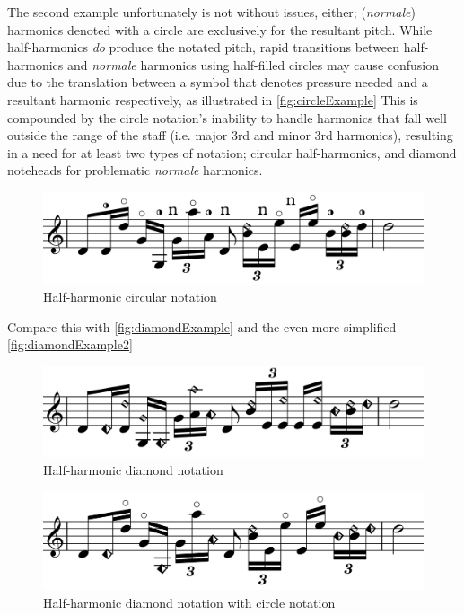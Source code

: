 The second example unfortunately is not without issues, either; (\emph{normale}) harmonics denoted with a circle are exclusively for the resultant pitch.\autocite[419]{gouldBars2011} 
While half-harmonics \emph{do} produce the notated pitch, rapid transitions between half-harmonics and \emph{normale} harmonics using half-filled circles may cause confusion due to the translation between a symbol that denotes pressure needed and a resultant harmonic respectively, as illustrated in \autoref{fig:circleExample}
This is compounded by the circle notation's inability to handle harmonics that fall well outside the range of the staff (i.e. major 3rd and minor 3rd harmonics), resulting in a need for at least two types of notation; circular half-harmonics, and diamond noteheads for problematic \emph{normale} harmonics.

\begin{figure}
    \includegraphics[width=\linewidth]{./resources/circleExample.pdf}
    \caption{Half-harmonic circular notation} \label{fig:circleExample}
  \end{figure}

Compare this with \autoref{fig:diamondExample} and the even more simplified \autoref{fig:diamondExample2}
  \begin{figure}
    \includegraphics[width=\linewidth]{./resources/diamondExample.pdf}
    \caption{Half-harmonic diamond notation} \label{fig:diamondExample}
  \end{figure}

  \begin{figure}
    \includegraphics[width=\linewidth]{./resources/diamondExample2.pdf}
    \caption{Half-harmonic diamond notation with circle notation} \label{fig:diamondExample2}
  \end{figure}

